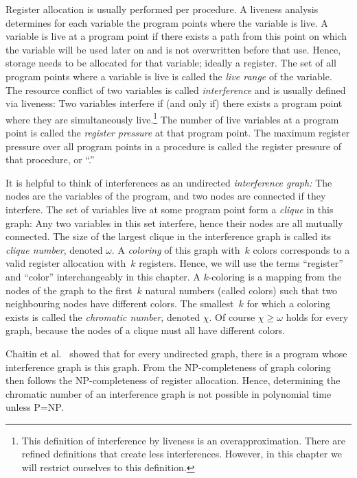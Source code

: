 {Register allocation is usually performed per procedure.
A liveness analysis determines for each variable the program points where the variable is live.
A variable is live at a program point if there exists a path from this point on which the variable will be used later on and is not overwritten before that use.
Hence, storage needs to be allocated for that variable; ideally a register.
The set of all program points where a variable is live is called the \emph{live range} of the variable.
The resource conflict of two variables is called \emph{interference} and is usually defined via liveness:
Two variables interfere if (and only if) there exists a program point where 
they are simultaneously live.\footnote{
This definition of interference by liveness is an overapproximation.
There are refined definitions that create less interferences.
However, in this chapter we will restrict ourselves to this definition.
}
The number of live variables at a program point is called the \emph{register pressure} at that program point. 
The maximum register pressure over all program points in a procedure is called 
the register pressure of that procedure, or ``\maxlive.''

It is helpful to think of interferences as an undirected \emph{interference graph:}
The nodes are the variables of the program, and
two nodes are connected if they interfere.
The set of variables live at some program point form a \emph{clique} in this graph:
Any two variables in this set interfere, hence their nodes are all mutually connected.
The size of the largest clique in the interference graph is called its 
\emph{clique number}, denoted $\omega$.
A \emph{coloring} of this graph with~$k$ colors corresponds to a valid register allocation with~$k$ registers.
Hence, we will use the terms ``register'' and ``color'' interchangeably in this chapter.
A $k$-coloring is a mapping from the nodes of the graph to the first~$k$ 
natural numbers (called colors) such that two neighbouring nodes have different colors.
The smallest~$k$ for which a coloring exists is called the \emph{chromatic 
number}, denoted $\chi$.
Of course $\chi\ge\omega$ holds for every graph, because the nodes of a clique must all have different colors.

Chaitin et al.~\cite{chaitin:1981:register} showed that for every undirected 
graph, there is a program whose interference graph is this graph.
From the NP-completeness of graph coloring then follows the NP-completeness of register allocation.
Hence, determining the chromatic number of an interference graph is not possible in polynomial time unless P=NP.

}
